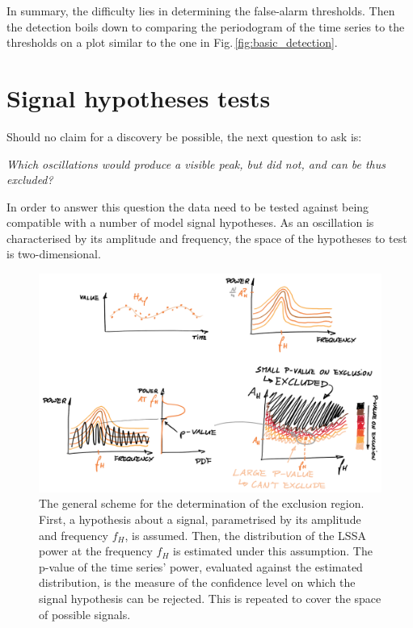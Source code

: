 In summary, the difficulty lies in determining the false-alarm thresholds.
Then the detection boils down to comparing the periodogram of the time series to the thresholds on a plot similar to the one in Fig.\,\ref{fig:basic_detection}.




\section{Signal hypotheses tests}
\label{sec:signal_hypotheses_tests}
Should no claim for a discovery be possible, the next question to ask is:
\begin{center}
  \emph{Which oscillations would produce a visible peak, but did not, and can be thus excluded?}
\end{center}
In order to answer this question the data need to be tested against being compatible with a number of model signal hypotheses.
As an oscillation is characterised by its amplitude and frequency, the space of the hypotheses to test is two-dimensional.

\begin{figure}
  \centering \includegraphics[width=\linewidth]{gfx/axions/exclusion_region.png}
  \caption{The general scheme for the determination of the exclusion region.
  First, a hypothesis about a signal, parametrised by its amplitude and frequency $f_H$, is assumed.
  Then, the distribution of the LSSA power at the frequency $f_H$ is estimated under this assumption.
  The p-value of the time series' power, evaluated against the estimated distribution, is the measure of the confidence level on which the signal hypothesis can be rejected.
  This is repeated to cover the space of possible signals.}\label{fig:exclusion_region}
\end{figure}

